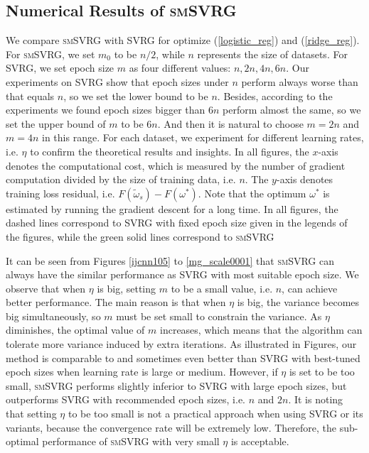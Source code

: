 \documentclass[letterpaper]{article}
\begin{document}
 \subsection{Numerical Results of \textsc{smSVRG}}
 We compare \textsc{smSVRG} with SVRG for optimize (\ref{logistic_reg}) and (\ref{ridge_reg}). For \textsc{smSVRG}, we set $m_0$ to be $n/2$, while $n$ represents the size of datasets. For SVRG, we set epoch size $m$ as four different values: $n, 2n, 4n, 6n$. Our experiments on SVRG show that epoch sizes under $n$ perform always worse than that equals $n$, so we set the lower bound to be $n$. Besides, according to the experiments we found epoch sizes bigger than $6n$ perform almost the same, so we set the upper bound of $m$ to be $6n$. And then it is natural to choose $m=2n$ and $m=4n$ in this range. For each dataset, we experiment for different learning rates, i.e. $\eta$ to confirm the theoretical results and insights. In all figures, the $x$-axis denotes the computational cost, which is measured by the number of gradient computation divided by the size of training data, i.e. $n$. The $y$-axis denotes training loss residual, i.e. $F(\tilde{\omega}_s) - F(\omega^{*})$. Note that the optimum $\omega^*$ is estimated by running the gradient descent for a long time. In all figures, the 
dashed lines correspond to SVRG with fixed epoch size given in the legends of the figures, while the green solid lines correspond to \textsc{smSVRG}

It can be seen from Figures \ref{ijcnn105} to \ref{mg_scale0001} that \textsc{smSVRG} can always have the similar performance as SVRG with most suitable epoch size. We observe that when $\eta$ is big, setting $m$ to be a small value, i.e. $n$, can achieve better performance. The main reason is that when $\eta$ is big, the variance becomes big simultaneously, so $m$ must be set  small to constrain the variance. As $\eta$ diminishes, the optimal value of $m$ increases, which means that the algorithm can tolerate more variance induced by extra iterations. As illustrated in Figures, our method is comparable to and sometimes even better than SVRG with best-tuned epoch sizes when learning rate is large or medium. However, if $\eta$ is set to be too small, \textsc{smSVRG} performs slightly inferior to  SVRG with large epoch sizes, but outperforms SVRG with recommended epoch sizes, i.e. $n$ and $2n$. It is noting that setting $\eta$ to be too small is not a practical approach when using SVRG or its variants, because the convergence rate will be extremely low. Therefore, the sub-optimal performance of \textsc{smSVRG} with very small $\eta$ is acceptable.
 
\end{document}
